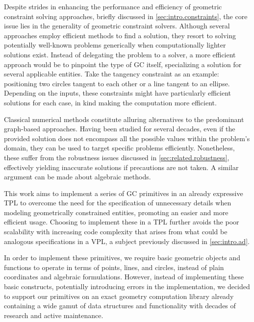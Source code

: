 %
\label{chap:solution}
\cleardoublepage{}

\noindent
Despite strides in enhancing the performance and efficiency of geometric
constraint solving approaches, briefly discussed in
\cref{sec:intro.constraints}, the core issue lies in the generality of geometric
constraint solvers.  Although several approaches employ efficient methods to
find a solution, they resort to solving potentially well-known problems
generically when computationally lighter solutions exist.  Instead of delegating
the problem to a solver, a more efficient approach would be to pinpoint the type
of \ac{GC} itself, specializing a solution for several applicable entities.
Take the tangency constraint as an example: positioning two circles tangent to
each other or a line tangent to an ellipse.  Depending on the inputs, these
constraints might have particularly efficient solutions for each case, in kind
making the computation more efficient.

Classical numerical methods constitute alluring alternatives to the predominant
graph-based approaches.  Having been studied for several decades, even if the
provided solution does not encompass all the possible values within the
problem's domain, they can be used to target specific problems efficiently.
Nonetheless, these suffer from the robustness issues discussed in
\cref{sec:related.robustness}, effectively yielding inaccurate solutions if
precautions are not taken.  A similar argument can be made about algebraic
methods.

This work aims to implement a series of \ac{GC} primitives in an already
expressive \ac{TPL} to overcome the need for the specification of unnecessary
details when modeling geometrically constrained entities, promoting an easier
and more efficient usage.  Choosing to implement these in a \ac{TPL} further
avoids the poor scalability with increasing code complexity that arises from
what could be analogous specifications in a \ac{VPL}, a subject previously
discussed in \cref{sec:intro.ad}.

In order to implement these primitives, we require basic geometric objects and
functions to operate in terms of points, lines, and circles, instead of plain
coordinates and algebraic formulations.  However, instead of implementing these
basic constructs, potentially introducing errors in the implementation, we
decided to support our primitives on an exact geometry computation library
already containing a wide gamut of data structures and functionality with
decades of research and active maintenance.

